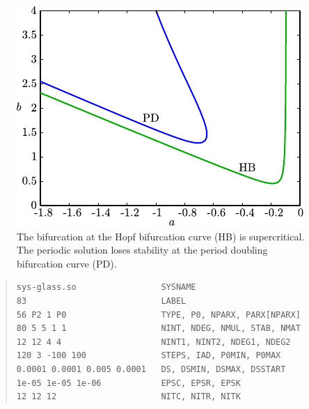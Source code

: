 \documentclass[10pt,a4paper]{ddedoc}
\begin{document}
\begin{figure}[t!]
\begin{center}
\includegraphics{fig/plot-pd-ns}
\end{center}
\caption{The bifurcation at the Hopf bifurcation curve (HB) is supercritical. 
The periodic solution loses stability at the period doubling bifurcation curve (PD).}
\label{pdbif}
\end{figure}

{ \small \begin{quote} \begin{lstlisting}[basicstyle=\tt,frame=single]
sys-glass.so                 SYSNAME
83                           LABEL
56 P2 1 P0                   TYPE, P0, NPARX, PARX[NPARX]
80 5 5 1 1                   NINT, NDEG, NMUL, STAB, NMAT
12 12 4 4                    NINT1, NINT2, NDEG1, NDEG2
120 3 -100 100               STEPS, IAD, P0MIN, P0MAX
0.0001 0.0001 0.005 0.0001   DS, DSMIN, DSMAX, DSSTART
1e-05 1e-05 1e-06            EPSC, EPSR, EPSK
12 12 12                     NITC, NITR, NITK
\end{lstlisting} \end{quote} } \noindent
\end{document}
